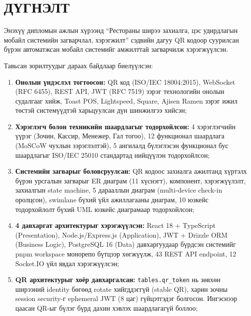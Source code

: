 \chapter*{ДҮГНЭЛТ}

Энэхүү дипломын ажлын хүрээнд ``Рестораны ширээ захиалга, цэс удирдлагын мобайл
системийн загварчлал, хэрэгжилт'' сэдвийн дагуу QR кодоор суурилсан бүрэн
автоматжсан мобайл системийг амжилттай загварчилж хэрэгжүүлсэн.

Тавьсан зорилтуудыг дараах байдлаар биелүүлсэн:

\begin{enumerate}[leftmargin=*]
  \item \textbf{Онолын үндэслэл тогтоосон:} QR код (ISO/IEC 18004:2015), WebSocket
    (RFC 6455), REST API, JWT (RFC 7519) зэрэг технологийн онолын судалгааг хийж,
    Toast POS, Lightspeed, Square, Ajisen Ramen зэрэг ижил төстэй системүүдтэй
    харьцуулсан дүн шинжилгээ хийсэн;

  \item \textbf{Хэрэглэгч болон техникийн шаардлагыг тодорхойлсон:} 4 хэрэглэгчийн
    үүрэг (Зочин, Кассир, Менежер, Гал тогоо), 12 функционал шаардлага (MoSCoW
    чухлын зэрэглэлтэй), 5 ангилалд бүлэглэсэн функционал бус шаардлагыг ISO/IEC
    25010 стандартад нийцүүлэн тодорхойлсон;

  \item \textbf{Системийн загварыг боловсруулсан:} QR кодоос захиалга ажилтанд
    хүртэлх бүрэн урсгалын загварыг ER диаграм (11 хүснэгт), компонент,
    хэрэгжүүлэлт, захиалгын state machine, 5 дарааллын диаграм (multi-device
    check-in оролцсон), swimlane бүхий үйл ажиллагааны диаграм, 10 юзкейс
    тодорхойлолт бүхий UML юзкейс диаграмаар тодорхойлсон;

  \item \textbf{4 давхаргат архитектурыг хэрэгжүүлсэн:} React 18 + TypeScript
    (Presentation), Node.js/Express.js (Application), JWT + Drizzle ORM (Business
    Logic), PostgreSQL 16 (Data) давхаргуудаар бүрдсэн системийг pnpm workspace
    монорепо бүтцээр хөгжүүлж, 43 REST API endpoint, 12 Socket.IO үйл явдал
    хэрэгжүүлсэн;

  \item \textbf{QR архитектурыг хоёр давхаргалсан:} \texttt{tables.qr\_token}
    нь зөвхөн ширээний identity бөгөөд rotate хийгддэггүй (stable QR), харин
    зочны session security-г ephemeral JWT (8 цаг) гүйцэтгэдэг болгосон.
    Ингэснээр цаасан QR-ыг бүлэг бүрд дахин хэвлэх шаардлагагүй боллоо;


\end{enumerate}
